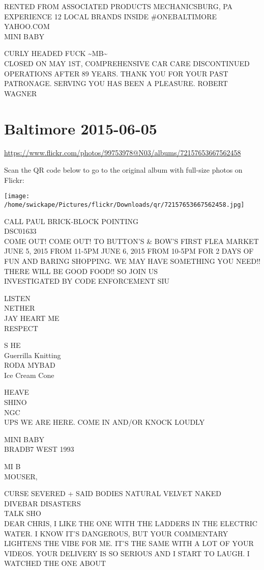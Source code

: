 \documentclass[10pt,letterpaper]{article}
\begin{document}
RENTED FROM ASSOCIATED PRODUCTS MECHANICSBURG, PA\\
EXPERIENCE 12 LOCAL BRANDS INSIDE \#ONEBALTIMORE\\
YAHOO.COM\\
MINI BABY

CURLY HEADED FUCK \textasciitilde{}MB\textasciitilde{}\\
CLOSED ON MAY 1ST, COMPREHENSIVE CAR CARE DISCONTINUED OPERATIONS AFTER 89 YEARS.  THANK YOU FOR YOUR PAST PATRONAGE.  SERVING YOU HAS BEEN A PLEASURE.  ROBERT WAGNER


\section*{Baltimore 2015-06-05}

\url{https://www.flickr.com/photos/99753978@N03/albums/72157653667562458}

Scan the QR code below to go to the original album with full-size photos on Flickr:

\texttt{[image: /home/swickape/Pictures/flickr/Downloads/qr/72157653667562458.jpg]}


CALL PAUL BRICK{-}BLOCK POINTING\\
DSC01633\\
COME OUT!  COME OUT!  TO BUTTON'S \& BOW'S FIRST FLEA MARKET JUNE 5, 2015 FROM 11{-}5PM JUNE 6, 2015 FROM 10{-}5PM FOR 2 DAYS OF FUN AND BARING SHOPPING.  WE MAY HAVE SOMETHING YOU NEED!! THERE WILL BE GOOD FOOD!! SO JOIN US\\
INVESTIGATED BY CODE ENFORCEMENT SIU

LISTEN\\
NETHER\\
JAY HEART ME\\
RESPECT

S HE\\
Guerrilla Knitting\\
RODA MYBAD\\
Ice Cream Cone

HEAVE\\
SHINO\\
NGC\\
UPS WE ARE HERE.  COME IN AND/OR KNOCK LOUDLY

MINI BABY\\
BRADB7 WEST 1993

MI B\\
MOUSER,

CURSE SEVERED  + SAID BODIES NATURAL VELVET NAKED\\
DIVEBAR DISASTERS\\
TALK SHO\\
DEAR CHRIS, I LIKE THE ONE WITH THE LADDERS IN THE ELECTRIC WATER.  I KNOW IT'S DANGEROUS, BUT YOUR COMMENTARY LIGHTENS THE VIBE FOR ME.  IT'S THE SAME WITH A LOT OF YOUR VIDEOS.  YOUR DELIVERY IS SO SERIOUS AND I START TO LAUGH.  I WATCHED THE ONE ABOUT
\end{document}
